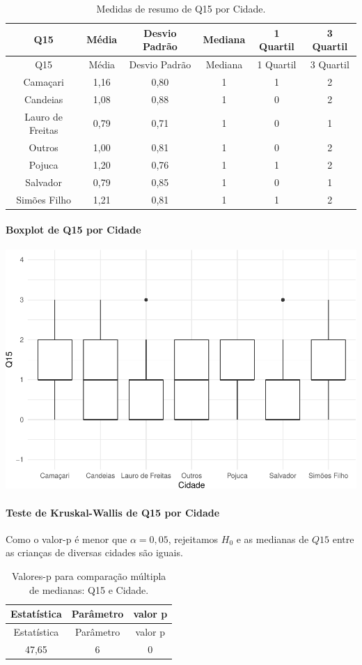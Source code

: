 \documentclass[]{article}
\let\oldparagraph\paragraph
\renewcommand{\paragraph}[1]{\oldparagraph{#1}\mbox{}}
\begin{document}
\begin{longtable}[]{@{}cccccc@{}}
\caption{\label{tab:unnamed-chunk-101}Medidas de resumo de Q15 por Cidade.}\tabularnewline
\toprule
Q15 & Média & Desvio Padrão & Mediana & 1 Quartil & 3 Quartil\tabularnewline
\midrule
\endfirsthead
\toprule
Q15 & Média & Desvio Padrão & Mediana & 1 Quartil & 3 Quartil\tabularnewline
\midrule
\endhead
Camaçari & 1,16 & 0,80 & 1 & 1 & 2\tabularnewline
Candeias & 1,08 & 0,88 & 1 & 0 & 2\tabularnewline
Lauro de Freitas & 0,79 & 0,71 & 1 & 0 & 1\tabularnewline
Outros & 1,00 & 0,81 & 1 & 0 & 2\tabularnewline
Pojuca & 1,20 & 0,76 & 1 & 1 & 2\tabularnewline
Salvador & 0,79 & 0,85 & 1 & 0 & 1\tabularnewline
Simões Filho & 1,21 & 0,81 & 1 & 1 & 2\tabularnewline
\bottomrule
\end{longtable}

\hypertarget{boxplot-de-q15-por-cidade}{%
\paragraph{Boxplot de Q15 por Cidade}\label{boxplot-de-q15-por-cidade}}

\begin{center}\includegraphics[width=0.75\linewidth]{relatorio_files/figure-latex/unnamed-chunk-102-1} \end{center}

\hypertarget{teste-de-kruskal-wallis-de-q15-por-cidade}{%
\paragraph{Teste de Kruskal-Wallis de Q15 por Cidade}\label{teste-de-kruskal-wallis-de-q15-por-cidade}}

Como o valor-p é menor que \(\alpha=0,05\), rejeitamos \(H_0\) e as medianas de \(Q15\) entre as crianças de diversas cidades são iguais.

\begin{longtable}[]{@{}ccc@{}}
\caption{\label{tab:unnamed-chunk-103}Valores-p para comparação múltipla de medianas: Q15 e Cidade.}\tabularnewline
\toprule
Estatística & Parâmetro & valor p\tabularnewline
\midrule
\endfirsthead
\toprule
Estatística & Parâmetro & valor p\tabularnewline
\midrule
\endhead
47,65 & 6 & 0\tabularnewline
\bottomrule
\end{longtable}
\end{document}
